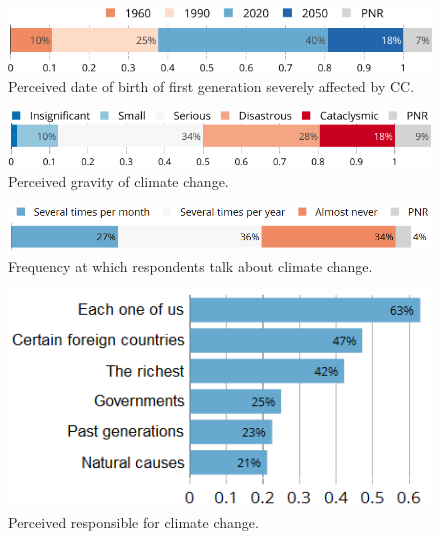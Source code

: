 \documentclass[english,5p,authoryear]{elsarticle}
\begin{document}


\begin{figure}[t]
\centering
\includegraphics[width=\columnwidth]{Images/CC_generation_min_nolegend_trim.png}
\caption{Perceived date of birth of first generation severely affected by CC.}
\label{fig:generation}
\end{figure}

\begin{figure}[t]
\centering
\includegraphics[width=\columnwidth]{Images/CC_effects_nolegend.png}
\caption{Perceived gravity of climate change.}
\label{fig:gravity}
\end{figure}

\begin{figure}[b] %
\centering
\includegraphics[width=\columnwidth]{Images/CC_talks_nolegend.png}
\caption{Frequency at which respondents talk about climate change.}
\label{fig:talks}
\end{figure}


\begin{figure}[!htbp]
\centering
\includegraphics[width=0.75\columnwidth]{Images/CC_responsiblec.png}
\caption{Perceived responsible for climate change.}
\label{fig:responsible}
\end{figure}
\end{document}
